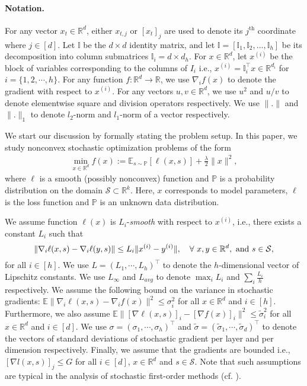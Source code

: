 
\paragraph{Notation.}  
For any vector $x_t \in \mathbb{R}^d$, either $x_{t,j}$ or $[x_t]_{j}$ are used to denote its $j^{\text{th}}$ coordinate where $j \in [d]$.  Let $\mathbb{I}$ be the $d \times d$ identity matrix, and let $\mathbb{I} = [\mathbb{I}_1, \mathbb{I}_2,...,\mathbb{I}_h]$ be its decomposition into column submatrices $\mathbb{I}_i = d \times d_h$. For $x \in \mathbb{R}^d$, let $x^{(i)}$ be the block of variables corresponding to the columns of $I_i$ i.e., $x^{(i)} = \mathbb{I}_i^\top x \in \mathbb{R}^{d_i}$  for
$i = \{1, 2, \cdots ,h\}$. For any function $f:\mathbb{R}^d \rightarrow \mathbb{R}$, we use $\nabla_i f(x)$ to denote the gradient with respect to $x^{(i)}$. For any vectors $u, v \in \mathbb{R}^d$, we use $u^2$ and $u/v$ to denote elementwise square and division operators respectively.
We use $\|.\|$ and $\|.\|_1$ to denote $l_2$-norm and $l_1$-norm of a vector respectively.

We start our discussion by formally stating the problem setup.  In this paper, we study nonconvex stochastic optimization problems of the form
\begin{align}
\label{eq:1}
\min_{x \in \mathbb{R}^d} f(x) := \mathbb{E}_{s \sim \mathbb{P}}[\ell(x, s)] + \frac{\lambda}{2} \|x\|^2,
\end{align}
where $\ell$ is a smooth (possibly nonconvex) function and $\mathbb{P}$ is a probability distribution on the domain $\mathcal{S} \subset \mathbb{R}^k$. 
Here, $x$ corresponds to model parameters, $\ell$ is the loss function and $\mathbb{P}$ is an unknown data distribution. 

We assume function $\ell(x)$ is $L_i$-\emph{smooth} with respect to $x^{(i)}$, i.e.,  there exists a constant $L_i$ such that
\begin{equation}
\label{eq:l-const}
  \|\nabla_i \ell(x, s)-\nabla_i \ell(y, s)\| \le L_i\|x^{(i)}-y^{(i)}\|,\quad\forall\ x, y \in \mathbb{R}^d, \text{ and  } s \in \mathcal{S},
\end{equation}
for all $i \in [h]$. We use $L = (L_1, \cdots, L_h)^\top$ to denote the $h$-dimensional vector of Lipschitz constants. 
We use $L_\infty$ and $L_{avg}$ to denote $\max_i L_i$ and $\sum_i \tfrac{L_i}{h}$ respectively.  We assume the following bound on the variance in stochastic gradients: $\mathbb{E}\|\nabla_i \ell(x, s) - \nabla_i f(x)\|^2 \leq \sigma_i^2$ for all $x \in \mathbb{R}^d$ and $i \in [h]$.    
Furthermore, we also assume $\mathbb{E}\|[\nabla \ell(x, s)]_i - [\nabla f(x)]_i\|^2 \leq \tilde{\sigma}_i^2$ for all $x \in \mathbb{R}^d$ and $i \in [d]$.  
We use $\sigma = (\sigma_1, \cdots, \sigma_h)^\top$ and $\tilde{\sigma} = (\tilde{\sigma}_1, \cdots, \tilde{\sigma}_d)^\top$ to denote the vectors of standard deviations of stochastic gradient per layer and per dimension respectively.  
Finally, we assume that the gradients are bounded i.e., $[\nabla l(x,s)]_j \leq G$ for all $i \in [d]$, $x \in \mathbb{R}^d$ and $s \in \mathcal{S}$. 
Note that such assumptions are typical in the analysis of stochastic first-order methods (cf. \citep{Ghadimi13,Ghadimi14}). 

